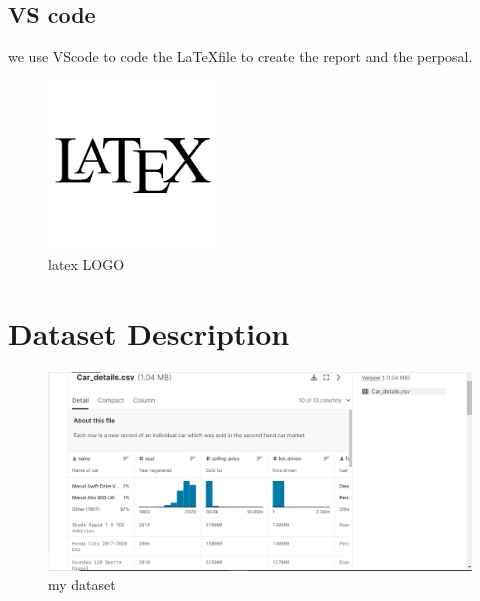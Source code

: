 \documentclass{article}
\begin{document}
\subsection{VS code}
we use VScode to code the \LaTeX  file to create the report and the perposal.

\begin{figure}[!h]
    \centering
    \includegraphics[width=0.4\textwidth]{latex.png}
    \caption{latex LOGO}
    \label{fig:my_label}
\end{figure}

\section{Dataset Description}

\begin{figure}[!h]
    \centering
    \includegraphics[width=1\textwidth]{car-details.png}
    \caption{my dataset}
    \label{fig:my_label}
\end{figure}
\end{document}
